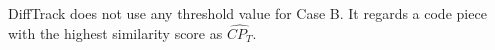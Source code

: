 DiffTrack does not use any threshold value for Case B.
It regards a code piece with the highest similarity score as $\widehat{CP_T}$.



